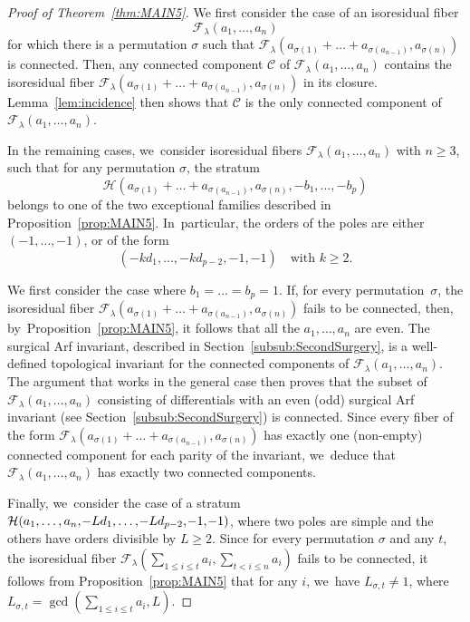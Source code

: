 \documentclass[JEP,XML,SOM,Unicode,NoFloatCountersInSection,published]{cedram}
\theoremstyle{definition}
\begin{document}
\begin{proof}[Proof of Theorem~\ref{thm:MAIN5}]
We first consider the case of an isoresidual fiber\vspace*{-3pt}
\[
\mathcal{F}_{\lambda}(a_{1},\dots,a_{n})
\]
for which there is a permutation $\sigma$ such that $\mathcal{F}_{\lambda}(a_{\sigma(1)}+\dots+a_{\sigma(a_{n-1})},a_{\sigma(n)})$ is connected. Then, any connected component $\mathcal{C}$ of $\mathcal{F}_{\lambda}(a_{1},\dots,a_{n})$ contains the isoresidual fiber $\mathcal{F}_{\lambda}(a_{\sigma(1)}+\dots+a_{\sigma(a_{n-1})},a_{\sigma(n)})$ in its closure. Lemma~\ref{lem:incidence} then shows that $\mathcal{C}$ is the only connected component of $\mathcal{F}_{\lambda}(a_{1},\dots,a_{n})$.

In the remaining cases, we~consider isoresidual fibers $\mathcal{F}_{\lambda}(a_{1},\dots,a_{n})$ with $n \geq 3$, such that for any permutation $\sigma$, the stratum\vspace*{-3pt}
\[
\mathcal{H}(a_{\sigma(1)}+\dots+a_{\sigma(a_{n-1})},a_{\sigma(n)},-b_{1},\dots,-b_{p})
\]
belongs to one of the two exceptional families described in
Proposition~\ref{prop:MAIN5}. In~particular, the orders of the poles are either $(-1,\dots,-1)$, or of the form
\[
(-kd_{1},\dots,-kd_{p-2},-1,-1)\quad\text{with }k \geq 2.
\]

We first consider the case where $b_{1}=\dots=b_{p}=1$. If, for every permutation~$\sigma$, the isoresidual fiber $\mathcal{F}_{\lambda}(a_{\sigma(1)}+\dots+a_{\sigma(a_{n-1})},a_{\sigma(n)})$ fails to be connected, then, by~Proposition~\ref{prop:MAIN5}, it follows that all the $a_{1},\dots,a_{n}$ are even. The surgical Arf invariant, described in Section~\ref{subsub:SecondSurgery}, is a well-defined topological invariant for the connected components of $\mathcal{F}_{\lambda}(a_{1},\dots,a_{n})$. The argument that works in the general case then proves that the subset of $\mathcal{F}_{\lambda}(a_{1},\dots,a_{n})$ consisting of differentials with an even (\resp odd) surgical Arf invariant (see Section~\ref{subsub:SecondSurgery}) is connected. Since every fiber of the form $\mathcal{F}_{\lambda}(a_{\sigma(1)}+\dots+a_{\sigma(a_{n-1})},a_{\sigma(n)})$ has exactly one (non-empty) connected component for each parity of the invariant, we~deduce that $\mathcal{F}_{\lambda}(a_{1},\dots,a_{n})$ has exactly two connected components.

Finally, we~consider the case of a stratum $\mathcal{H}(a_{1},\dots,a_{n},\mkern-2mu -Ld_{1},\dots,\mkern-2mu -Ld_{p-2},\mkern-2mu -1,\mkern-2mu -1)$, where two poles are simple and the others have orders divisible by $L \geq 2$. Since for every permutation $\sigma$ and any $t$, the isoresidual fiber $\mathcal{F}_{\lambda}(\sum_{1 \leq i \leq t} a_{i}, \sum_{t< i\leq n} a_{i})$ fails to be connected, it follows from Proposition~\ref{prop:MAIN5} that for any $i$, we~have $L_{\sigma,t} \neq 1$, where $L_{\sigma,t} = \gcd(\sum_{1 \leq i \leq t} a_{i},L)$.


\end{proof}
\end{document}

